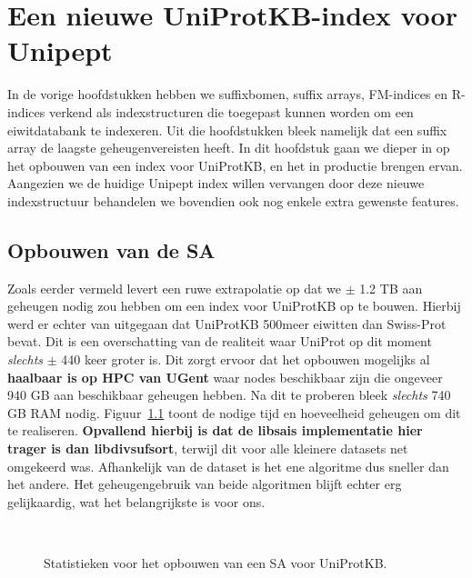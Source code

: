 \chapter{Een nieuwe UniProtKB-index voor Unipept}\label{ch:een-nieuwe-uniprotkb-index-voor-unipept}
In de vorige hoofdstukken hebben we suffixbomen, suffix arrays, FM-indices en R-indices verkend als indexstructuren die toegepast kunnen worden om een eiwitdatabank te indexeren.
Uit die hoofdstukken bleek namelijk dat een suffix array de laagste geheugenvereisten heeft.
In dit hoofdstuk gaan we dieper in op het opbouwen van een index voor UniProtKB, en het in productie brengen ervan.
Aangezien we de huidige Unipept index willen vervangen door deze nieuwe indexstructuur behandelen we bovendien ook nog enkele extra gewenste features.

\section{Opbouwen van de SA}\label{sec:opbouwen-van-de-sa}
Zoals eerder vermeld levert een ruwe extrapolatie op dat we $\pm$ 1.2 TB aan geheugen nodig zou hebben om een index voor UniProtKB op te bouwen.
Hierbij werd er echter van uitgegaan dat UniProtKB 500\times meer eiwitten dan Swiss-Prot bevat.
Dit is een overschatting van de realiteit waar UniProt op dit moment \textit{slechts} $\pm$ 440 keer groter is.
Dit zorgt ervoor dat het opbouwen mogelijks al \textbf{haalbaar is op HPC van UGent} waar nodes beschikbaar zijn die ongeveer 940 GB aan beschikbaar geheugen hebben.
Na dit te proberen bleek \textit{slechts} 740 GB RAM nodig.
Figuur~\ref{fig:build_uniprot} toont de nodige tijd en hoeveelheid geheugen om dit te realiseren.
\textbf{Opvallend hierbij is dat de libsais implementatie hier trager is dan libdivsufsort}, terwijl dit voor alle kleinere datasets net omgekeerd was.
Afhankelijk van de dataset is het ene algoritme dus sneller dan het andere.
Het geheugengebruik van beide algoritmen blijft echter erg gelijkaardig, wat het belangrijkste is voor ons.
\\
\begin{figure}[H]
    \centering
    \\[4ex] %

    \caption{Statistieken voor het opbouwen van een SA voor UniProtKB.}\label{fig:build_uniprot}
\end{figure}

